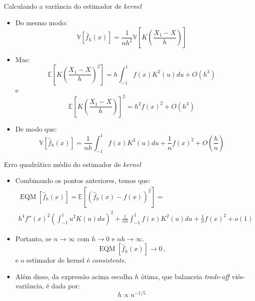 \documentclass[11pt]{beamer}
\begin{document}
	\begin{frame}{Calculando a variância do estimador de \textit{kernel}}
		\begin{itemize}
			\item Do mesmo modo:
			$$		\mathbb{V}[\hat{f}_h(x)] = \frac{1}{nh^2}\mathbb{V}\left[K\left(\frac{X_1 - X}{h}\right)\right]$$
			\item Mas:
			$$\mathbb{E}\left[K\left(\frac{X_1 - X}{h}\right)^2\right] = h \int_{-1}^{1} f(x) K^2(u) du + O(h^3)$$
			e$$\mathbb{E}\left[K\left(\frac{X_1 - X}{h}\right)\right]^2 = h^2f(x)^2  + O(h^3)$$
			\item De modo que:
			$$\mathbb{V}[\hat{f}_h(x)] = \frac{1}{nh} \int_{-1}^{1} f(x) K^2(u) du+ \frac{1}{n}f(x)^2 + O\left(\frac{h}{n}\right)$$		
		\end{itemize}
		

	\end{frame}
	\begin{frame}{Erro quadrático médio do estimador de \textit{kernel}}
		\begin{itemize}
			\item Combinando os pontos anteriores, temos que:
			\begin{equation*}
				\begin{aligned}
					\operatorname{EQM}[\hat{f}_h(x)] = \mathbb{E}[(\hat{f}_h(x) - f(x))^2] = \\ 
					h^4 f''(x)^2 \left(\int_{-1}^{1}u^2 K(u)du\right)^2 + \frac{1}{nh} \int_{-1}^{1} f(x) K^2(u) du+ \frac{1}{n}f(x)^2 + o(1)
				\end{aligned}
			\end{equation*}
			\item Portanto, se $n \to \infty$ com $h\to 0$ e $nh \to \infty$.
			$$\operatorname{EQM}[\hat{f}_h(x)] \to 0\, ,$$
			e o estimador de kernel é \textit{consistente}.
			\item Além disso, da expressão acima escolha $h$ ótima, que balanceia \textit{trade-off} viés-variância,  é dada por:
			$$h \propto n^{-1/5} $$ 
			
		\end{itemize}
	\end{frame}
\end{document}

